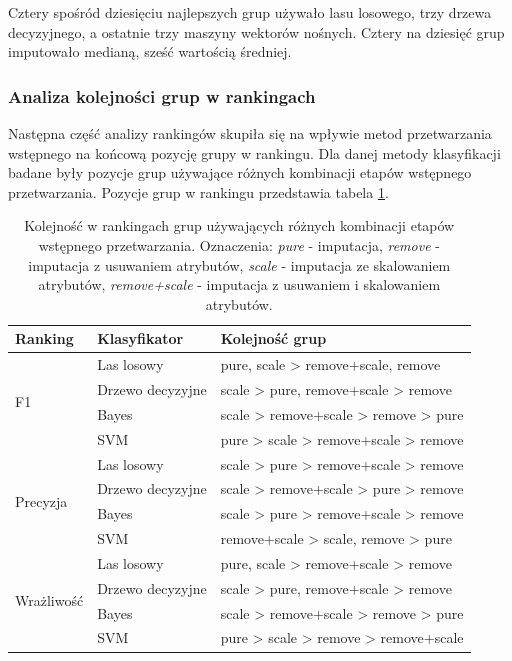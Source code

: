 \documentclass[../thesis.tex]{subfiles}
\begin{document}
Cztery spośród dziesięciu najlepszych grup używało lasu losowego, trzy drzewa decyzyjnego, a ostatnie trzy maszyny wektorów nośnych. Cztery na dziesięć grup imputowało medianą, sześć wartością średniej.

\subsubsection{Analiza kolejności grup w rankingach}

Następna część analizy rankingów skupiła się na wpływie metod przetwarzania wstępnego na końcową pozycję grupy w rankingu. Dla danej metody klasyfikacji badane były pozycje grup używające różnych kombinacji etapów wstępnego przetwarzania. Pozycje grup w rankingu przedstawia tabela \ref{results:table_rankings}.

\begin{table}[h]
\begin{center}
\begin{tabular}{ | l | l | p{100mm} | }
\hline
\rowcolor{lightgray} Ranking & Klasyfikator & Kolejność grup \\\hline

\multirow{4}{*}{F1} & Las losowy & pure, scale > remove+scale, remove \\\cline{2-3}
                    & Drzewo decyzyjne & scale > pure, remove+scale > remove\\\cline{2-3}
                    & Bayes & scale > remove+scale > remove > pure\\\cline{2-3}
                    & SVM & pure > scale > remove+scale > remove\\\hline
\multirow{4}{*}{Precyzja} & Las losowy & scale > pure > remove+scale > remove \\\cline{2-3}
                    & Drzewo decyzyjne & scale > remove+scale > pure > remove\\\cline{2-3}
                    & Bayes & scale > pure > remove+scale > remove\\\cline{2-3}
                    & SVM & remove+scale > scale, remove > pure\\\hline
\multirow{4}{*}{Wrażliwość} & Las losowy & pure, scale > remove+scale > remove \\\cline{2-3}
                    & Drzewo decyzyjne & scale > pure, remove+scale > remove\\\cline{2-3}
                    & Bayes & scale > remove+scale > remove > pure\\\cline{2-3}
                    & SVM & pure > scale > remove > remove+scale\\\hline

\end{tabular}
\caption{Kolejność w rankingach grup używających różnych kombinacji etapów wstępnego przetwarzania. Oznaczenia: \emph{pure} - imputacja, \emph{remove} - imputacja z usuwaniem atrybutów, \emph{scale} - imputacja ze skalowaniem atrybutów, \emph{remove+scale} - imputacja z usuwaniem i skalowaniem atrybutów.}
\label{results:table_rankings}
\end{center}
\end{table}
\end{document}
